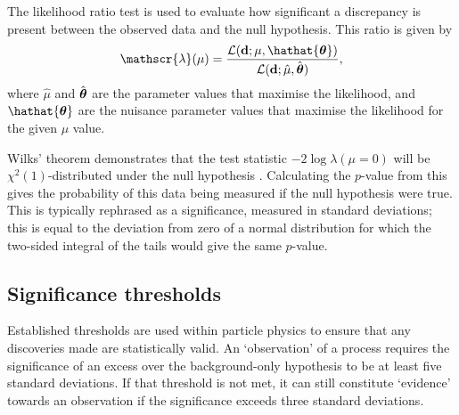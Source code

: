 The likelihood ratio test is used to evaluate how significant a discrepancy is
present between the observed data and the null hypothesis. This ratio is given
by
\begin{equation*}
  \mathscr{\lambda}(\mu) = \frac{ \mathcal{L}( \dvec ; \mu, \hathat{\thetavec} ) }
                                { \mathcal{L}( \dvec ; \hat{\mu}, \hat{\thetavec} ) },
\end{equation*}
where $\hat{\mu}$ and $\hat{\boldsymbol{\theta}}$ are the parameter values that maximise
the likelihood, and $\hathat{\thetavec}$ are the nuisance parameter values that
maximise the likelihood for the given $\mu$ value.

Wilks' theorem demonstrates that the test statistic $-2\log\lambda(\mu=0)$ will
be $\chi^2(1)$-distributed under the null hypothesis \cite{Wilks1938}.
Calculating the $p$-value from this gives the probability of this data being
measured if the null hypothesis were true. This is typically rephrased as a
significance, measured in standard deviations; this is equal to the deviation
from zero of a normal distribution for which the two-sided integral of the tails
would give the same $p$-value.


\subsection{Significance thresholds}
\label{sec:methods-stats-signifthresh}

Established thresholds are used within particle physics to ensure that any
discoveries made are statistically valid. An `observation' of a process requires
the significance of an excess over the background-only hypothesis to be at least
five standard deviations. If that threshold is not met, it can still constitute
`evidence' towards an observation if the significance exceeds three standard
deviations.
